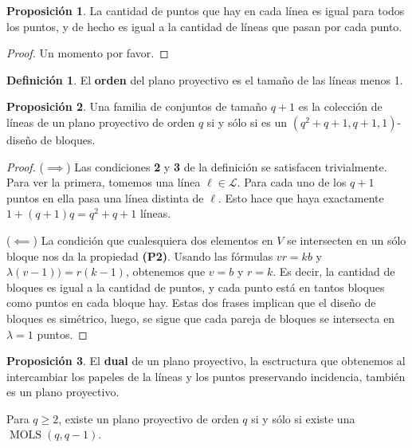 \documentclass[spanish]{book}
\theoremstyle{definition}
\newtheorem*{defn}{Definición}
\newtheorem*{prop}{Proposición}
\DeclareMathOperator{\MOLS}{MOLS}
\begin{document}
\begin{prop}
	La cantidad de puntos que hay en cada línea es igual para todos los puntos, y de hecho es igual a la cantidad de líneas que pasan por cada punto.
\end{prop}
\begin{proof}
	Un momento por favor.
\end{proof}
\begin{defn}
	El \textbf{orden} del plano proyectivo es el tamaño de las líneas menos 1.
\end{defn}
\begin{prop}
	Una familia de conjuntos de tamaño $q+1$ es la colección de líneas de un plano proyectivo de orden $q$ si y sólo si es un $(q^2+q+1,q+1,1)$-diseño de bloques.
\end{prop}
\begin{proof}\leavevmode
	
	($\implies$) Las condiciones \textbf{2} y \textbf{3} de la definición se satisfacen trivialmente. Para ver la primera, tomemos una línea $\ell\in\mathcal{L}$. Para cada uno de los $q+1$ puntos en ella pasa una línea distinta de $\ell$. Esto hace que haya exactamente $1+(q+1)q=q^2+q+1$ líneas.
	
	($\impliedby$) La condición que cualesquiera dos elementos en $V$ se intersecten en un sólo bloque nos da la propiedad \textbf{(P2)}. Usando las fórmulas $vr=kb$ y $\lambda(v-1))=r(k-1)$, obtenemos que $v=b$ y $r=k$. Es decir, la cantidad de bloques es igual a la cantidad de puntos, y cada punto está en tantos bloques como puntos en cada bloque hay. Estas dos frases implican que el diseño de bloques es simétrico, luego, se sigue que cada pareja de bloques se intersecta en $\lambda=1$ puntos.
\end{proof}
\begin{prop}
	El \textbf{dual} de un plano proyectivo, la esctructura que obtenemos al intercambiar los papeles de la líneas y los puntos preservando incidencia, también es un plano proyectivo.
\end{prop}
\begin{teo}
	Para $q\geq2$, existe un plano proyectivo de orden $q$ si y sólo si existe una $\MOLS(q,q-1)$.
\end{teo}
\end{document}
